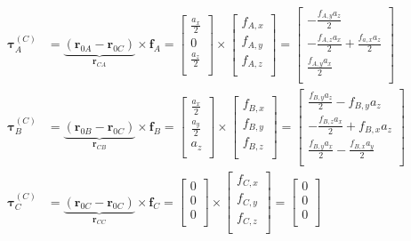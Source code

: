 \documentclass[a4paper,12p]{article}
\begin{document}
\begin{align*}
	\boldsymbol{\tau}_{A}^{(C)} &= \underbrace{(\textbf{r}_{0A} - \textbf{r}_{0C})}_{\textbf{r}_{CA}} \times \textbf{f}_{A} = \left[\begin{array}{c} \frac{a_{x}}{2} \\ 0 \\ \frac{a_{z}}{2} \\\end{array}\right] \times \left[\begin{array}{c} f_{A,x} \\ f_{A,y} \\ f_{A,z} \\\end{array}\right] = \left[\begin{array}{c}
		-\frac{f_{A,y}a_{z}}{2} \\
		-\frac{f_{A,z}a_{x}}{2} + \frac{f_{a,x}a_{z}}{2} \\
		\frac{f_{A,y}a_{x}}{2} \\
	\end{array}\right]
	\\
	\boldsymbol{\tau}_{B}^{(C)} &= \underbrace{(\textbf{r}_{0B} - \textbf{r}_{0C})}_{\textbf{r}_{CB}} \times \textbf{f}_{B} = 
	\left[\begin{array}{c}
		\frac{a_{x}}{2} \\
		\frac{a_{y}}{2} \\
		a_{z} \\
	\end{array}\right]
	\times
	\left[
	\begin{array}{c}
		f_{B,x} \\
		f_{B,y} \\
		f_{B,z} \\
	\end{array}
	\right]
	=
	\left[\begin{array}{c}
	\frac{f_{B,y}a_{z}}{2} - f_{B,y}a_{z} \\
	-\frac{f_{B,z}a_{x}}{2} + f_{B,x}a_{z} \\
	\frac{f_{B,y}a_{x}}{2} - \frac{f_{B,x}a_{y}}{2} \\
	\end{array}\right]
	\\
	\boldsymbol{\tau}_{C}^{(C)} &= \underbrace{(\textbf{r}_{0C} - \textbf{r}_{0C})}_{\textbf{r}_{CC}} \times \textbf{f}_{C} = 
	\left[\begin{array}{c}
			0 \\
			0 \\
			0 \\
	\end{array}\right]
	\times
	\left[
	\begin{array}{c}
	f_{C,x} \\
	f_{C,y} \\
	f_{C,z} \\
	\end{array}
	\right]
	=
	\left[\begin{array}{c}
		0 \\
		0 \\
		0 \\
	\end{array}\right]
\end{align*}
\end{document}
